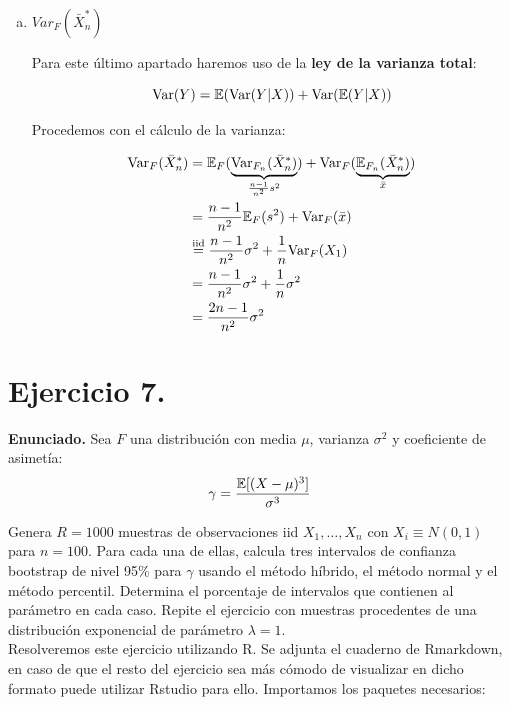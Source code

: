 \documentclass[a4paper]{article}
\begin{document}
\begin{enumerate}[a)]
	\item $Var_{F}(\bar X_n^*)$
	
	Para este último apartado haremos uso de la \textbf{ley de la varianza total}:
	
	\[
		\text{Var}(Y) = \mathbb{E}(\text{Var}(Y|X)) + \text{Var}(\mathbb{E}(Y|X))
	\]
	
	Procedemos con el cálculo de la varianza:
	
	\[
		\begin{split}
			\text{Var}_{F}(\bar X_n^*) & = \mathbb{E}_{F}( \underbrace{\text{Var}_{F_n}(\bar X^*_n)}_{\frac{n-1}{n^2} s^2} ) + \text{Var}_{F}( \underbrace{\mathbb{E}_{F_n}(\bar X^*_n)}_{\bar x} )\\
			& = \frac{n-1}{n^2} \mathbb{E}_{F}(s^2) + \text{Var}_{F}( \bar x ) \\
			& \stackrel{\text{iid}}{=} \frac{n-1}{n^2} \sigma^2 + \frac{1}{n} \text{Var}_{F}(X_1)  \\
			& = \frac{n-1}{n^2} \sigma^2 + \frac{1}{n} \sigma^2 \\
			& = \frac{2n-1}{n^2} \sigma^2 \\
		\end{split}
	\]
	
\end{enumerate}

\section*{Ejercicio 7.}

\textbf{Enunciado.} Sea $F$ una distribución con media $\mu$, varianza $\sigma^2$ y coeficiente de asimetía:
\[
	\gamma = \frac{\mathbb{E}[(X - \mu)^3]}{\sigma^3}
\]

Genera $R = 1000$ muestras de observaciones iid $X_1, \ldots, X_n$ con $X_i \equiv N(0, 1)$ para $n = 100$. Para cada una de ellas, calcula tres intervalos de confianza bootstrap de nivel 95\% para $\gamma$ usando el método híbrido, el método normal y el método percentil. Determina el porcentaje de intervalos que contienen al parámetro en cada caso. Repite el ejercicio con muestras procedentes de una distribución exponencial de parámetro $\lambda = 1$. \\

Resolveremos este ejercicio utilizando R. Se adjunta el cuaderno de Rmarkdown, en caso de que el resto del ejercicio sea más cómodo de visualizar en dicho formato puede utilizar Rstudio para ello. Importamos los paquetes necesarios:

\begin{Shaded}
	\begin{Highlighting}[]
\NormalTok{(}\NormalTok{())}
	\end{Highlighting}
\end{Shaded}
\end{document}
